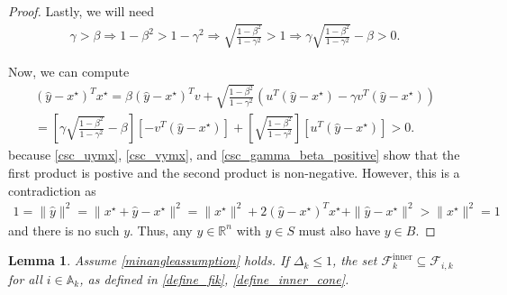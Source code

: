 \documentclass{article}
\newtheorem{lemma}[theorem]{Lemma}
\theoremstyle{case}
\newcommand{\activeconstraintsk}{{\mathbb A_{k}}}
\newcommand{\dk}{\Delta_k}
\newcommand{\fcki}{{\mathcal {F}^{\text{inner}}_k}}
\newcommand{\fik}{{\mathcal F_{i, k}}}
\newcommand{\Rn}{\mathbb R^n}
\begin{document}
\begin{proof}
Lastly, we will need
\begin{align}
\gamma > \beta 
\Longrightarrow 1 - \beta^2 > 1 - \gamma^2
\Longrightarrow \sqrt{\frac{1 - \beta^2}{1 - \gamma^2}} > 1
\Longrightarrow \gamma \sqrt{\frac{1 - \beta^2}{1 - \gamma^2}} - \beta > 0. \label{csc_gamma_beta_positive}
\end{align}

Now, we can compute
\begin{align*}
{\left(\hat y - x^{\star}\right)}^Tx^{\star} = 
\beta {\left(\hat y - x^{\star}\right)}^Tv
+ \sqrt{\frac{1 - \beta^2}{1 - \gamma^2}} 
\left(u^T\left(\hat y - x^{\star}\right) - \gamma v^T \left(\hat y - x^{\star}\right) \right)\\ 
= \left[\gamma \sqrt{\frac{1 - \beta^2}{1 - \gamma^2}} - \beta\right] \left[-v^T\left(\hat y - x^{\star}\right)\right]
+ \left[\sqrt{\frac{1 - \beta^2}{1 - \gamma^2}}\right] \left[u^T\left(\hat y - x^{\star}\right) \right] > 0.
\end{align*}
because \cref{csc_uymx}, \cref{csc_vymx}, and \cref{csc_gamma_beta_positive} show that the first product is postive and the second product is non-negative.
However, this is a contradiction as
\begin{align*}
1 = \|\hat y\|^2 = \|x^{\star} + \hat y - x^{\star}\|^2 = \|x^{\star}\|^2 + 2{\left(\hat y - x^{\star}\right)}^Tx^{\star} + \|\hat y - x^{\star}\|^2 > \|x^{\star}\|^2 = 1
\end{align*}
and there is no such $y$.
Thus, any $y \in\Rn$ with $y \in S$ must also have $y \in B$.
\end{proof}


\begin{lemma}
\label{inner_cone_inside_each_cone}
Assume \cref{minangleassumption} holds.
If $\dk \le 1$, the set $\fcki \subseteq \fik$ for all $i \in \activeconstraintsk$, as defined in \cref{define_fik}, \cref{define_inner_cone}.
\end{lemma}
\end{document}
